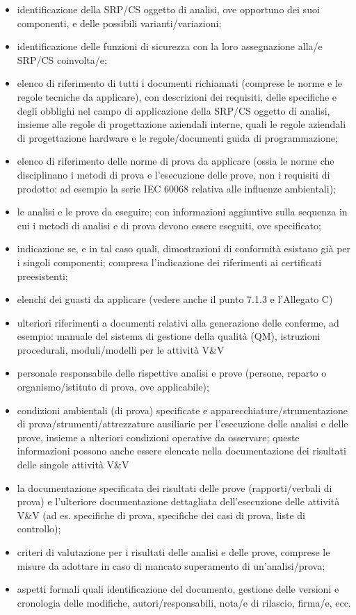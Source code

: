 \begin{itemize}
    \item identificazione della SRP/CS oggetto di analisi, ove opportuno dei suoi componenti, e delle possibili varianti/variazioni;
    \item identificazione delle funzioni di sicurezza con la loro assegnazione alla/e SRP/CS coinvolta/e;
    \item elenco di riferimento di tutti i documenti richiamati (comprese le norme e le regole tecniche da applicare), con descrizioni dei requisiti, delle specifiche e degli obblighi nel campo di applicazione della SRP/CS oggetto di analisi, insieme alle regole di progettazione aziendali interne, quali le regole aziendali di progettazione hardware e le regole/documenti guida di programmazione;
    \item elenco di riferimento delle norme di prova da applicare (ossia le norme che disciplinano i metodi di prova e l'esecuzione delle prove, non i requisiti di prodotto: ad esempio la serie IEC 60068 relativa alle influenze ambientali);
    \item le analisi e le prove da eseguire; con informazioni aggiuntive sulla sequenza in cui i metodi di analisi e di prova devono essere eseguiti, ove specificato;
    \item indicazione se, e in tal caso quali, dimostrazioni di conformità esistano già per i singoli componenti; compresa l'indicazione dei riferimenti ai certificati preesistenti;
    \item elenchi dei guasti da applicare (vedere anche il punto 7.1.3 e l'Allegato C)
    \item ulteriori riferimenti a documenti relativi alla generazione delle conferme, ad esempio: manuale del sistema di gestione della qualità (QM), istruzioni procedurali, moduli/modelli per le attività V\&V
    \item personale responsabile delle rispettive analisi e prove (persone, reparto o organismo/istituto di prova, ove applicabile);
    \item condizioni ambientali (di prova) specificate e apparecchiature/strumentazione di prova/strumenti/attrezzature ausiliarie per l'esecuzione delle analisi e delle prove, insieme a ulteriori condizioni operative da osservare; queste informazioni possono anche essere elencate nella documentazione dei risultati delle singole attività V\&V
    \item la documentazione specificata dei risultati delle prove (rapporti/verbali di prova) e l'ulteriore documentazione dettagliata dell'esecuzione delle attività V\&V (ad es. specifiche di prova, specifiche dei casi di prova, liste di controllo);
    \item criteri di valutazione per i risultati delle analisi e delle prove, comprese le misure da adottare in caso di mancato superamento di un'analisi/prova;
    \item aspetti formali quali identificazione del documento, gestione delle versioni e cronologia delle modifiche, autori/responsabili, nota/e di rilascio, firma/e, ecc.
\end{itemize}

